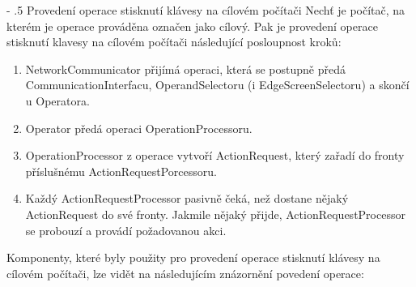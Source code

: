 \documentclass[12pt]{article}
\makeatletter
\newcommand\nodegui{GraphicalUserInterface}
\newcommand\nodeui{UserInterface}
\newcommand\nodepm{PluginManager}
\newcommand\nodeconf{Configurator}
\newcommand\nodeo{Operator}
\newcommand\nodeoc{OperationCreator}
\newcommand\nodeop{OperationProcessor}
\newcommand\nodeci{CommunicationInterface}
\newcommand\nodeos{OperandSelector}
\newcommand\nodenm{NetworkCommunicator}
\newcommand\nodeml{MouseLogger}
\newcommand\nodekl{KeyLogger}
\newcommand\nodems{MouseSimulator}
\newcommand\nodeks{KeySimulator}
\newcommand\nodeses{ScreenEdgeSelector}
\renewcommand\paragraph{%
    \@startsection{paragraph}{4}{0mm}%
       {-\baselineskip}%
       {.5\baselineskip}%
       {\normalfont\normalsize\bfseries}}
\makeatother
\begin{document}
\begin{center}
\end{center}

\paragraph{Provedení operace stisknutí klávesy na cílovém počítači}
Nechť je počítač, na kterém je operace prováděna označen jako cílový. Pak je provedení operace stisknutí klavesy na cílovém počítači následující posloupnost kroků:
\begin{enumerate}[leftmargin=5mm]
\item NetworkCommunicator přijímá operaci, která se postupně předá CommunicationInterfacu, OperandSelectoru (i EdgeScreenSelectoru) a skončí u Operatora.
\item Operator předá operaci OperationProcessoru.
\item OperationProcessor z operace vytvoří ActionRequest, který zařadí do fronty příslušnému ActionRequestPorcessoru.
\item Každý ActionRequestProcessor pasivně čeká, než dostane nějaký ActionRequest do své fronty. Jakmile nějaký přijde, ActionRequestProcessor se probouzí a provádí požadovanou akci.
\end{enumerate}
Komponenty, které byly použity pro provedení operace stisknutí klávesy na cílovém počítači, lze vidět na následujícím znázornění povedení operace:
\end{document}
